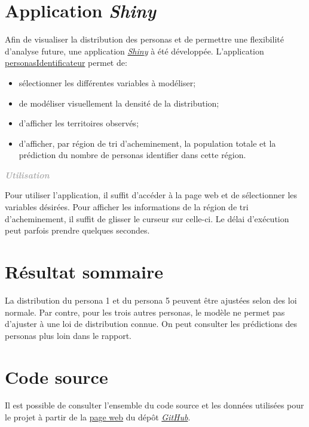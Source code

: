 \documentclass[11pt,french]{report}\usepackage[]{graphicx}\usepackage[]{color}
\newenvironment{moreInfo}[1]
	{\begin{mdframed}
	\textcolor{darkgray}{\huge \raisebox{-3.5pt}{\faInfo} 
	\hspace{0.5cm} \large\bfseries #1}\\[5pt]
	\normalsize
	\makebox[0.1\textwidth][l]{}	
	\begin{minipage}{10cm}}
	{	\end{minipage}
	\end{mdframed}}
\begin{document}
\section*{Application \emph{Shiny}}

Afin de visualiser la distribution des personas et de permettre une flexibilité d'analyse future, une application \href{https://www.rstudio.com/products/shiny/}{\emph{Shiny}} à été développée. L'application \href{https://davebulaval.shinyapps.io/personnasIdentificateur/}{personasIdentificateur} permet de:
\begin{itemize}
\item sélectionner les différentes variables à modéliser;
\item de modéliser visuellement la densité de la distribution;
\item d'afficher les territoires observés;
\item d'afficher, par région de tri d'acheminement, la population totale et la prédiction du nombre de personas identifier dans cette région.
\end{itemize}

\begin{moreInfo}{\color{Gray}\emph{Utilisation}
     \color{black}}
Pour utiliser l'application, il suffit d'accéder à la page web et de sélectionner les variables désirées. Pour afficher les informations de la région de tri d'acheminement, il suffit de glisser le curseur sur celle-ci.
     \newline
     Le délai d'exécution peut parfois prendre quelques secondes. 
\end{moreInfo}

\section*{Résultat sommaire}
La distribution du persona 1 et du persona 5 peuvent être ajustées selon des loi normale. Par contre, pour les trois autres personas, le modèle ne permet pas d'ajuster à une loi de distribution connue. On peut consulter les prédictions des personas plus loin dans le rapport.

\section*{Code source}
Il est possible de consulter l'ensemble du code source et les données utilisées pour le projet à partir de la \href{https://davebulaval.github.io/Actulab_COOP/}{page web} du dépôt \href{https://github.com/davebulaval/Actulab_COOP}{\emph{GitHub}}.
\end{document}
